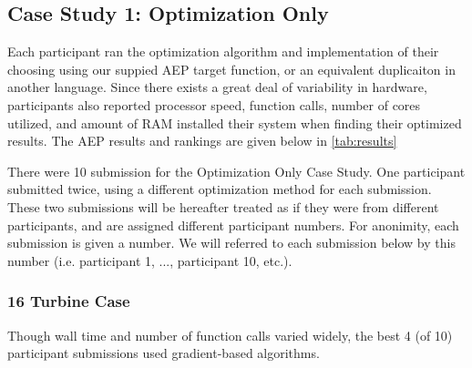 
\subsection{Case Study 1: Optimization Only}

Each participant ran the optimization algorithm and implementation of their choosing using our suppied AEP target function, or an equivalent duplicaiton in another language.
Since there exists a great deal of variability in hardware, participants also reported processor speed, function calls, number of cores utilized, and amount of RAM installed their system when finding their optimized results.
The AEP results and rankings are given below in \cref{tab:results}

There were 10 submission for the Optimization Only Case Study.
One participant submitted twice, using a different optimization method for each submission.
These two submissions will be hereafter treated as if they were from different participants, and are assigned different participant numbers.
For anonimity, each submission is given a number.
We will referred to each submission below by this number (i.e. participant 1, ..., participant 10, etc.).

\subsubsection{16 Turbine Case}

	Though wall time and number of function calls varied widely, the best 4 (of 10) participant submissions used gradient-based algorithms.

